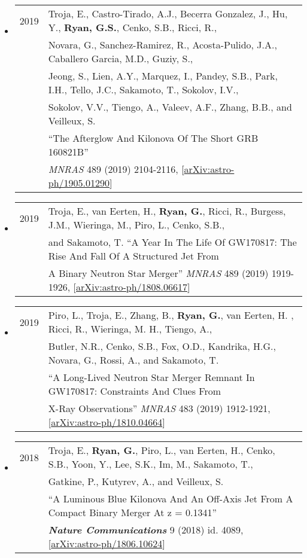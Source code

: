 \begin{itemize}
\item \begin{tabular}{ll}
2019 & {Troja}, E., {Castro-Tirado}, A.J.,  {Becerra Gonzalez}, J.,
         {Hu}, Y., {\bf {Ryan}, G.S.}, {Cenko}, S.B., {Ricci}, R., \\ &
         {Novara}, G., {Sanchez-Ramirez}, R., {Acosta-Pulido}, J.A.,
         {Caballero Garcia}, M.D., {Guziy}, S.,  \\ &
         {Jeong}, S.,
         {Lien}, A.Y., {Marquez}, I., {Pandey}, S.B., {Park}, I.H.,
         {Tello}, J.C., {Sakamoto}, T., {Sokolov}, I.V., \\ &
         {Sokolov}, V.V., {Tiengo}, A., {Valeev}, A.F.,
         {Zhang}, B.B., and {Veilleux}, S. \\ &``The Afterglow And Kilonova Of The Short GRB 160821B'' \\ &
         \emph{MNRAS} 489 (2019) 2104-2116, [\href{https://arxiv.org/abs/1905.01290}{arXiv:astro-ph/1905.01290}]
\end{tabular}

\item \begin{tabular}{ll}
2019 & Troja, E., van Eerten, H., {\bf Ryan, G.}, Ricci, R., Burgess, J.M., Wieringa, M., Piro, L., Cenko, S.B.,\\
	& and Sakamoto, T. ``A Year In The Life Of GW170817: The Rise And Fall Of A Structured Jet From\\
	&  A Binary Neutron Star Merger'' \emph{MNRAS} 489 (2019) 1919-1926, [\href{https://arxiv.org/abs/1808.06617}{arXiv:astro-ph/1808.06617}]
\end{tabular}

\item \begin{tabular}{ll}
2019 &  Piro, L., Troja, E., Zhang, B., {\bf Ryan, G.}, van Eerten, H. , Ricci, R., Wieringa, M. H., Tiengo, A.,\\
	& Butler, N.R., Cenko, S.B., Fox, O.D., Kandrika, H.G., Novara, G., Rossi, A., and Sakamoto, T. \\
	& ``A Long-Lived Neutron Star Merger Remnant In GW170817: Constraints And Clues From\\
	& X-Ray Observations'' \emph{MNRAS} 483 (2019) 1912-1921, [\href{https://arxiv.org/abs/1810.04664}{arXiv:astro-ph/1810.04664}]
\end{tabular}

\item \begin{tabular}{ll}
2018 & Troja, E., {\bf Ryan, G.}, Piro, L., van Eerten, H., Cenko, S.B., Yoon, Y., Lee, S.K., Im, M., Sakamoto, T., \\
	& Gatkine, P., Kutyrev, A., and Veilleux, S. \\
	& ``A Luminous Blue Kilonova And An Off-Axis Jet From A Compact Binary Merger At z = 0.1341''\\
	& \emph{\bf Nature Communications} 9 (2018) id. 4089, [\href{https://arxiv.org/abs/1806.10624}{arXiv:astro-ph/1806.10624}]
\end{tabular}


\end{itemize}
